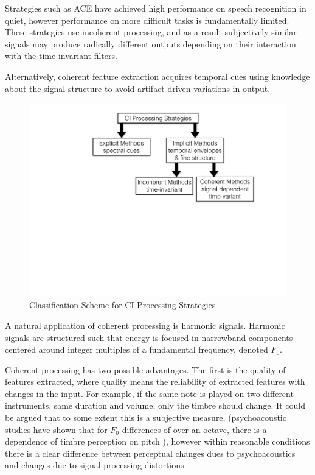\documentclass [11pt, proquest,oneside] {ganter_thesis}[2015/03/03]
\begin{document}
Strategies such as ACE have achieved high performance on speech recognition in quiet, however performance on more difficult tasks is fundamentally limited.  These strategies use incoherent processing, and as a result subjectively similar signals may produce radically different outputs depending on their interaction with the time-invariant filters.

Alternatively, coherent feature extraction acquires temporal cues using knowledge about the signal structure to avoid artifact-driven variations in output.

\begin{figure}[!ht]
  \centering
    \includegraphics[width=.8\textwidth]{explicitVimplicit}   
    \caption{Classification Scheme for CI Processing Strategies}\label{fig:explicitVimplicit}
\end{figure}

A natural application of coherent processing is harmonic signals.  Harmonic signals are structured such that energy is focused in narrowband components centered around integer multiples of a fundamental frequency, denoted $F_0$.

Coherent processing has two possible advantages.  The first is the quality of features extracted, where quality means the reliability of extracted features with changes in the input.  For example, if the same note is played on two different instruments, same duration and volume, only the timbre should change.  It could be argued that to some extent this is a subjective measure, (psychoacoustic studies have shown that for $F_0$ differences of over an octave, there is a dependence of timbre perception on pitch \cite{marozeau2003dependency}), however within reasonable conditions there is a clear difference between perceptual changes dues to psychoacoustics and changes due to signal processing distortions.
\end{document}
